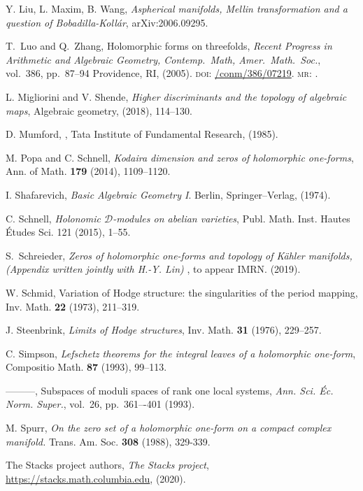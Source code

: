\documentclass[a4paper,12pt,reqno]{amsart}
\theoremstyle{plain}
\theoremstyle{definition}
\theoremstyle{remark}
\begin{document}
\begin{thebibliography}{HKLR}

 Y. Liu, L. Maxim, B. Wang, \textit{Aspherical manifolds, Mellin transformation and a question of Bobadilla-Koll\'ar}, arXiv:2006.09295.

 T.\ Luo and Q.\ Zhang, Holomorphic forms on threefolds, \textit{Recent Progress in Arithmetic and Algebraic Geometry, Contemp.\ Math, Amer.\ Math.\ Soc.}, vol.\ 386, pp.\ 87--94 Providence, RI, (2005). 
\textsc{doi}: \href{https://doi.org/org/10.1090/conm/386/07219}{/conm/386/07219}.
\textsc{mr}: \href{http://www.ams.org/mathscinet-getitem?mr=2182772}{}.

 L. Migliorini and V. Shende, \textit{Higher discriminants and the topology of algebraic maps}, Algebraic geometry, (2018), 114--130.

 D. Mumford, , Tata Institute of Fundamental Research, (1985).

 M. Popa and C. Schnell, \textit{Kodaira dimension and zeros of holomorphic one-forms}, Ann. of Math. \textbf{179} (2014), 1109--1120.


 I. Shafarevich, \textit{Basic Algebraic Geometry I}. Berlin, Springer--Verlag, (1974).

C. Schnell, {\it  Holonomic $\mathcal{D}$-modules on abelian varieties},
Publ. Math. Inst. Hautes \'{E}tudes Sci. 121 (2015), 1--55.

 S.\ Schreieder, \textit{Zeros of holomorphic one-forms and topology of K\"ahler manifolds, (Appendix written jointly with H.-Y. Lin) }, to appear IMRN. (2019).

 W. Schmid, Variation of Hodge structure: the singularities of the period mapping, Inv. Math. \textbf{22} (1973), 211--319.

 J. Steenbrink, \textit{Limits of Hodge structures}, Inv. Math. \textbf{31} (1976), 229--257.




 C. Simpson, \textit{Lefschetz theorems for the integral leaves of a holomorphic one-form}, Compositio Math. \textbf{87} (1993), 99--113.

 ---------, Subspaces of moduli spaces of rank one local systems, \textit{Ann. Sci. \'Ec. Norm. Super.}, vol.\ 26,
pp.\ 361–-401 (1993).

 M. Spurr, {\it On the zero set of a holomorphic one-form on a compact complex manifold.} Trans. Am.
Soc. \textbf{308} (1988), 329-339. 

 The {Stacks project authors}, \textit{The Stacks project}, \url{https://stacks.math.columbia.edu}, (2020).


\end{thebibliography}
\end{document}
